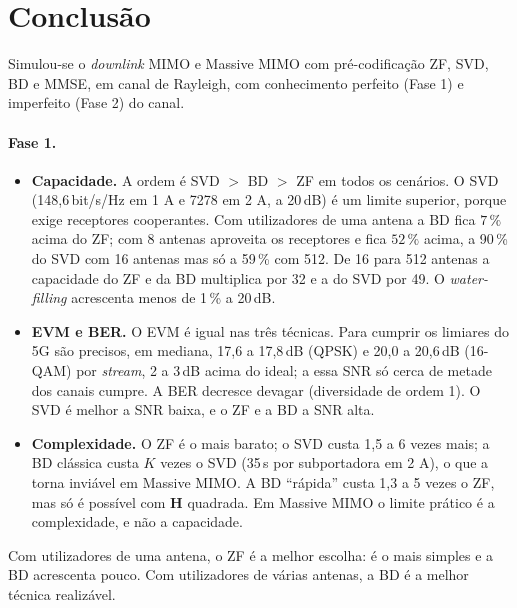 \section{Conclusão}
\label{sec:conclusao}

Simulou-se o \emph{downlink} MIMO e Massive MIMO com pré-codificação ZF, SVD, BD e MMSE, em canal de Rayleigh, com conhecimento perfeito (Fase 1) e imperfeito (Fase 2) do canal.

\paragraph{Fase 1.}
\begin{itemize}
  \item \textbf{Capacidade.} A ordem é SVD $>$ BD $>$ ZF em todos os cenários. O SVD (148,6\,bit/s/Hz em 1 A e 7278 em 2 A, a 20\,dB) é um limite superior, porque exige receptores cooperantes. Com utilizadores de uma antena a BD fica $7\,\%$ acima do ZF; com 8 antenas aproveita os receptores e fica $52\,\%$ acima, a 90\,\% do SVD com 16 antenas mas só a 59\,\% com 512. De 16 para 512 antenas a capacidade do ZF e da BD multiplica por 32 e a do SVD por 49. O \emph{water-filling} acrescenta menos de 1\,\% a 20\,dB.
  \item \textbf{EVM e BER.} O EVM é igual nas três técnicas. Para cumprir os limiares do 5G são precisos, em mediana, 17,6 a 17,8\,dB (QPSK) e 20,0 a 20,6\,dB (16-QAM) por \emph{stream}, 2 a 3\,dB acima do ideal; a essa SNR só cerca de metade dos canais cumpre. A BER decresce devagar (diversidade de ordem 1). O SVD é melhor a SNR baixa, e o ZF e a BD a SNR alta.
  \item \textbf{Complexidade.} O ZF é o mais barato; o SVD custa 1,5 a 6 vezes mais; a BD clássica custa $K$ vezes o SVD (35\,s por subportadora em 2 A), o que a torna inviável em Massive MIMO. A BD ``rápida'' custa 1,3 a 5 vezes o ZF, mas só é possível com $\mathbf{H}$ quadrada. Em Massive MIMO o limite prático é a complexidade, e não a capacidade.
\end{itemize}
Com utilizadores de uma antena, o ZF é a melhor escolha: é o mais simples e a BD acrescenta pouco. Com utilizadores de várias antenas, a BD é a melhor técnica realizável.

